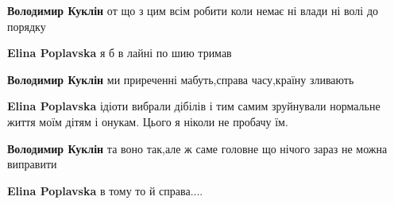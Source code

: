 \begin{itemize}
\begin{itemize}
\textbf{Володимир Куклін} от що з цим всім робити коли немає ні влади ні волі до порядку

 
\textbf{Elina Poplavska} я б в лайні по шию тримав

 
\textbf{Володимир Куклін} ми приреченні мабуть,справа часу,країну зливають

 
\textbf{Elina Poplavska} ідіоти вибрали дібілів і тим самим зруйнували нормальне життя моїм дітям і онукам. Цього я ніколи не пробачу їм.

 
\textbf{Володимир Куклін} та воно так,але ж саме головне що нічого зараз не можна виправити

 
\textbf{Elina Poplavska} в тому то й справа....
\end{itemize}

 

\end{itemize}
